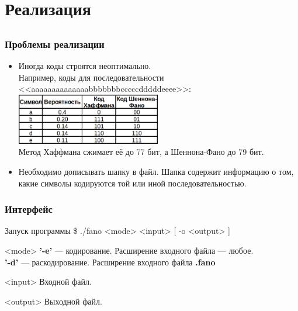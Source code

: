 \documentclass[10pt,pdf,hyperref={unicode}]{beamer}
\begin{document}
\section{Реализация}
\subsection{}

	\begin{frame}[t]\frametitle{Проблемы реализации}
			\begin{itemize}
				\item Иногда коды строятся неоптимально.\\
					Например, коды для последовательности\\
					<<aaaaaaaaaaaaaabbbbbbbcccccdddddeeee>>:\\
					\vspace{1em}
					\includegraphics[height=6em]{fano-haff.png}\\
					\vspace{1em}
					Метод Хаффмана сжимает её до 77 бит, а Шеннона-Фано до 79 бит.
				\item Необходимо дописывать шапку в файл.
					Шапка содержит информацию о том, какие символы кодируются той или иной последовательностью.
			\end{itemize}
	\end{frame}

	\begin{frame}
		\frametitle{Интерфейс}
		\begin{block}{Запуск программы}
			\$ ./fano <mode> <input> [ -o <output> ]
		\end{block}
		\begin{exampleblock}{<mode>}
			\textbf{'-e'} --- кодирование. Расширение входного файла --- любое.\\
			\textbf{'-d'} --- раскодирование. Расширение входного файла \textbf{.fano}
		\end{exampleblock}
		\begin{exampleblock}{<input>}
			Входной файл.
		\end{exampleblock}
		\begin{exampleblock}{<output>}
			Выходной файл.
		\end{exampleblock}
	\end{frame}
\end{document}
